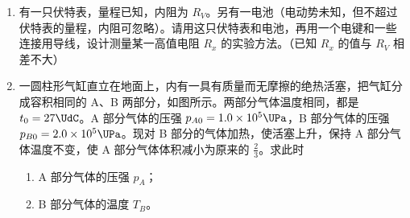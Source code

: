 \documentclass[\gkver]{gaokaozhenti}
\begin{document}
\begin{enumerate}
{\begin{enumerate}
	\item
	④$n = \frac{\sin i}{\sin r}$

\end{enumerate}
}

\item
有一只伏特表，量程已知，内阻为 $R_{V}$。另有一电池（电动势未知，但不超过伏特表的量程，内阻可忽略）。请用这只伏特表和电池，再用一个电键和一些连接用导线，设计测量某一高值电阻 $R_{x}$ 的实验方法。（已知 $R_{x}$ 的值与 $R_{V}$ 相差不大）

\item
一圆柱形气缸直立在地面上，内有一具有质量而无摩擦的绝热活塞，把气缸分成容积相同的 A、B 两部分，如图所示。两部分气体温度相同，都是 $t_{0} = 27\UdC$。A 部分气体的压强 $p_{A0} = 1.0\times10^{5}\UPa$，B 部分气体的压强 $p_{B0} = 2.0\times10^{5}\UPa$。现对 B 部分的气体加热，使活塞上升，保持 A 部分气体温度不变，使 A 部分气体体积减小为原来的 $\frac{2}{3}$。求此时
\begin{enumerate}
	\item
	A 部分气体的压强 $p_{A}$；
	\item
	B 部分气体的温度 $T_{B}$。
\end{enumerate}
\onepicture[align=right, w=3.5cm]{}
\end{enumerate}
\end{document}

